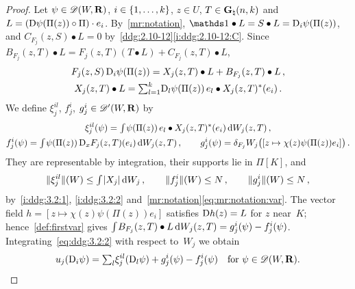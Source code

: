 \documentclass[a4paper,twoside,leqno]{article}
\newcommand{\Gk}{\pgrass{\adim}{\vdim}}        %
\begin{document}
\begin{proof}
    Let $\psi \in \mathscr{D}(W,\mathbf{R})$, $i \in \{1, \ldots, k\}$, $z \in U$, $T \in \Gk$ and $L =
    (\mathrm{D} \psi(\Pi(z)) \circ \Pi) \cdot e_i$. By~\ref{mr:notation}, $\id{} \bullet L = S \bullet
    L = \uD_i \psi(\Pi(z))$, and $C_{F_j}(z,S) \bullet L = 0$
    by~\ref{ddg:2.10-12}\ref{i:ddg:2.10-12:C}. Since $B_{F_j}(z,T) \bullet L = F_j(z,T) (T \bullet
    L) + C_{F_j}(z,T) \bullet L$,
    \begin{equation}
        \label{eq:ddg:3.2:2}
        \begin{gathered}
            F_j(z,S) \, \mathrm{D}_i \psi(\Pi(z)) = X_j(z,T) \bullet L + B_{F_j}(z,T) \bullet L \,, \\
            X_j(z,T) \bullet L = {\textstyle\sum_{l=1}^{k}} \mathrm{D}_l \psi(\Pi(z)) \, e_l \bullet
            X_j(z,T)^{*}(e_i) \,.
        \end{gathered}
    \end{equation}
    We define $\xi_j^{il}$, $f_j^i$, $g_j^i \in \mathscr{D}'(W,\mathbf{R})$ by
    \begin{gather*}
        \xi_j^{il}(\psi) = {\textstyle\int_{}^{}} \psi(\Pi(z)) \, e_l \bullet X_j(z,T)^{*}(e_i) \,\mathrm{d}
        W_j(z,T) \,, \\
        f_j^i(\psi) = {\textstyle\int_{}^{}} \psi(\Pi(z)) \, \mathrm{D}_x F_j(z,T)(e_i) \,\mathrm{d} W_j(z,T) \,, \qquad
        g_j^i(\psi) = \delta_{F_j} W_j \bigl( [ z \mapsto \chi(z) \psi(\Pi(z)) e_i ] \bigr) \,.
    \end{gather*}
    They are representable by integration, their supports lie in $\Pi[K]$, and
    \begin{equation}
        \label{eq:ddg:3.2:3}
        \|\xi_j^{il}\|(W) \le {\textstyle\int_{}^{}} |X_j| \,\mathrm{d} W_j \,, \qquad \|f_j^i\|(W) \le N \,, \qquad
        \|g_j^i\|(W) \le N \,,
    \end{equation}
    by~\ref{i:ddg:3.2:1}, \ref{i:ddg:3.2:2} and~\ref{mr:notation}\eqref{eq:mr:notation:var}. The
    vector field $h = [ z \mapsto \chi(z) \psi(\Pi(z)) e_i ]$ satisfies $\mathrm{D} h(z) = L$ for $z$
    near~$K$; hence~\ref{def:firstvar} gives ${\textstyle\int_{}^{}} B_{F_j}(z,T) \bullet L \,\mathrm{d} W_j(z,T) =
    g_j^i(\psi) - f_j^i(\psi)$. Integrating~\eqref{eq:ddg:3.2:2} with respect to~$W_j$ we obtain
    \begin{equation}
        \label{eq:ddg:3.2:4}
        u_j(\mathrm{D}_i \psi) = {\textstyle\sum_{l}^{}} \xi_j^{il}(\mathrm{D}_l \psi) + g_j^i(\psi) - f_j^i(\psi) \quad
        \text{for $\psi \in \mathscr{D}(W,\mathbf{R})$}.
    \end{equation}


\end{proof}
\end{document}
